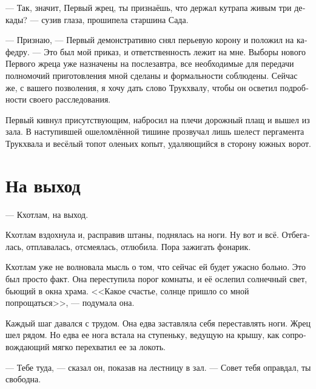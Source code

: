 \documentclass[a4paper,12pt,fleqn]{book}\usepackage{polyglossia}\setdefaultlanguage[babelshorthands=true]{russian}\setotherlanguage{english}\defaultfontfeatures{Ligatures=TeX,Mapping=tex-text}\usepackage{xcolor}\newcommand{\ml}[3]{#2}
\newcommand{\kutraph}{k\r{u}tr\={a}\`{a}ph}
\newcommand{\Trukchual}{Tr\`{u}kchu\r{a}l}
\begin{document}
\ml{$0$}
{--- Так, значит, Первый жрец, ты признаёшь, что держал кутрапа живым три декады? --- сузив глаза, прошипела старшина Сада.}
{``So you confess, Head Priest, that you have been keeping a \kutraph\ alive for three decades?'' Garden Head hissed, narrowing her eyes.}

\ml{$0$}
{--- Признаю, --- Первый демонстративно снял перьевую корону и положил на кафедру.}
{``I do.'' Head Priest defiantly took a feather crown off his head and put it on the pulpit.}
\ml{$0$}
{--- Это был мой приказ, и ответственность лежит на мне.}
{``It was my order, and I take full responsibility.}
\ml{$0$}
{Выборы нового Первого жреца уже назначены на послезавтра, все необходимые для передачи полномочий приготовления мной сделаны и формальности соблюдены.}
{The election of a new Head Priest is scheduled for the sunrise after tomorrow, I made all necessary preparations for the transfer of power, all formalities are handled.}
\ml{$0$}
{Сейчас же, с вашего позволения, я хочу дать слово Трукхвалу, чтобы он осветил подробности своего расследования.}
{Right now, with your permission, I'd like to give the floor to \Trukchual, so he could highlight details of his investigation.''}

Первый кивнул присутствующим, набросил на плечи дорожный плащ и вышел из зала.
В наступившей ошеломлённой тишине прозвучал лишь шелест пергамента Трукхвала и весёлый топот оленьих копыт, удаляющийся в сторону южных ворот.

\section{На выход}

--- Кхотлам, на выход.

Кхотлам вздохнула и, расправив штаны, поднялась на ноги.
Ну вот и всё.
Отбегалась, отплавалась, отсмеялась, отлюбила.
Пора зажигать фонарик.

Кхотлам уже не волновала мысль о том, что сейчас ей будет ужасно больно.
Это был просто факт.
Она переступила порог комнаты, и её ослепил солнечный свет, бьющий в окна храма.
<<Какое счастье, солнце пришло со мной попрощаться>>, --- подумала она.

Каждый шаг давался с трудом.
Она едва заставляла себя переставлять ноги.
Жрец шел рядом.
Но едва ее нога встала на ступеньку, ведущую на крышу, как сопровождающий мягко перехватил ее за локоть.

--- Тебе туда, --- сказал он, показав на лестницу в зал.
--- Совет тебя оправдал, ты свободна.
\end{document}
